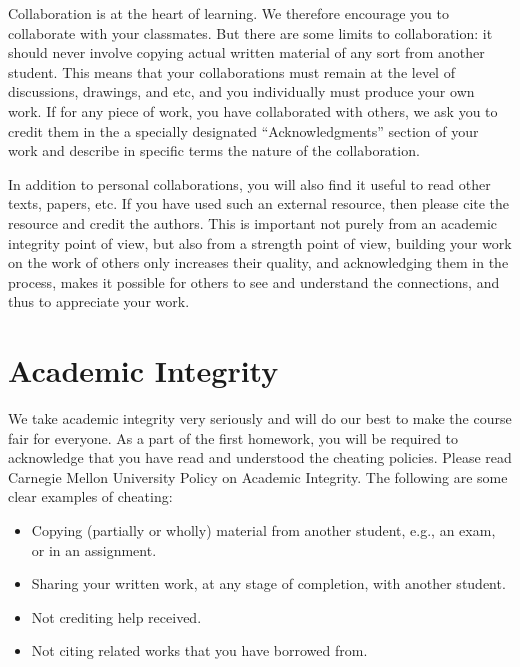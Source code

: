 Collaboration is at the heart of learning.  We therefore encourage you to collaborate with your classmates.
%
But there are some limits to collaboration: it should never involve copying actual written material of any sort from another student.
%
This means that your collaborations must remain at the level of discussions, drawings, and etc, and you individually must produce your own work.
%
If for any piece of work, you have collaborated with others, we ask you to credit them in the a specially designated ``Acknowledgments'' section of your work and describe in specific terms the nature of the collaboration.


In addition to personal collaborations, you will also find it useful to read other texts, papers, etc.
%
If you have used such an external resource, then please cite the resource and credit  the authors.
%
This is important not purely from an academic integrity point of view, but also from a strength point of view, building your work on the work of others only increases their quality, and acknowledging them in the process, makes it possible for others to see and understand the connections, and thus to appreciate your work.



\section{Academic Integrity}
We take academic integrity very seriously and will do our best to make the course fair for everyone. As a part of the first homework, you will be required to acknowledge that you have read and understood the cheating policies. Please read Carnegie Mellon University Policy on Academic Integrity. The following are some clear examples of cheating:

\begin{itemize}

\item Copying (partially or wholly) material from another student, e.g., an exam, or in an assignment.

\item Sharing your written work, at any stage of completion, with another student.

\item Not crediting help received.

\item Not citing related works that you have borrowed from.
\end{itemize}

